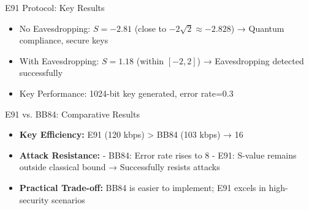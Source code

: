 \documentclass{beamer} %
\begin{document}
\begin{frame}{E91 Protocol: Key Results}
    \vspace{1em}
    \begin{itemize}[<+->]
        \item No Eavesdropping: $S=-2.81$ (close to $-2\sqrt{2}\approx-2.828$) → Quantum compliance, secure keys
        \item With Eavesdropping: $S=1.18$ (within $[-2,2]$) → Eavesdropping detected successfully
        \item Key Performance: 1024-bit key generated, error rate=0.3%
    \end{itemize}
\end{frame}

\begin{frame}{E91 vs. BB84: Comparative Results}
    \centering

    \vspace{1em}
    \begin{itemize}[<+->]
        \item \textbf{Key Efficiency:} E91 (120 kbps) > BB84 (103 kbps) → 16%
        \item \textbf{Attack Resistance:} 
              - BB84: Error rate rises to 8%
              - E91: S-value remains outside classical bound → Successfully resists attacks
        \item \textbf{Practical Trade-off:} BB84 is easier to implement; E91 excels in high-security scenarios
    \end{itemize}
\end{frame}
\end{document}
